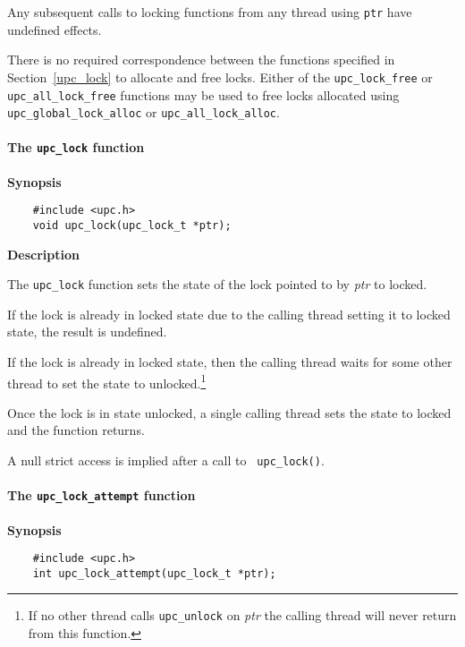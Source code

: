 \np Any subsequent calls to locking functions from any
    thread using {\tt ptr} have undefined effects. 

\np There is no required correspondence between the functions specified
    in Section~\ref{upc_lock} to allocate and free locks.
    Either of the {\tt upc\_lock\_free} or {\tt upc\_all\_lock\_free} functions
    may be used to free locks allocated using {\tt upc\_global\_lock\_alloc} or 
    {\tt upc\_all\_lock\_alloc}.

\cbend

\paragraph{The {\tt upc\_lock} function}

{\bf Synopsis} 

\npf\vspace{-2.5em}
\begin{verbatim}
    #include <upc.h> 
    void upc_lock(upc_lock_t *ptr); 
\end{verbatim}

{\bf Description}

\np The {\tt upc\_lock} function sets the state of the lock
    pointed to by {\em ptr} to locked.

\np If the lock is already in locked state due to the calling thread setting it
    to locked state, the result is undefined.

\np If the lock is already in locked state, then the calling
    thread waits for some other thread to set the state to 
    unlocked.\footnote{If no other thread calls {\tt upc\_unlock} on {\em ptr}
    the calling thread will never return from this function.}

\np Once the lock is in state unlocked, a single calling thread
    sets the state to locked and the function returns.

\np A null strict access is implied after a call to {\tt
    upc\_lock()}.

\paragraph{The {\tt upc\_lock\_attempt} function}

{\bf Synopsis} 

\npf\vspace{-2.5em}
\begin{verbatim}
    #include <upc.h> 
    int upc_lock_attempt(upc_lock_t *ptr); 
\end{verbatim}

